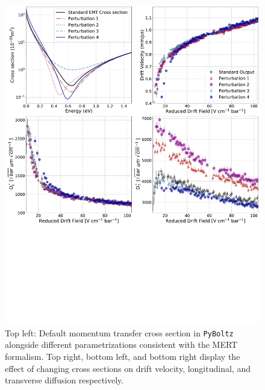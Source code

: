 \documentclass[3p,11pt]{elsarticle}
\begin{document}
\begin{figure}[t]
\begin{centering}
\includegraphics[width=0.85\columnwidth]{Figures/PyBoltz_MERT.pdf}
\par\end{centering}
\caption{Top left: Default momentum transfer cross section in {\tt PyBoltz} alongside different parametrizations consistent with the MERT formalism. Top right, bottom left, and bottom right display the effect of changing cross sections on drift velocity, longitudinal, and transverse diffusion respectively. 
\label{fig:PyBoltzMERT}}
\end{figure}
\end{document}
